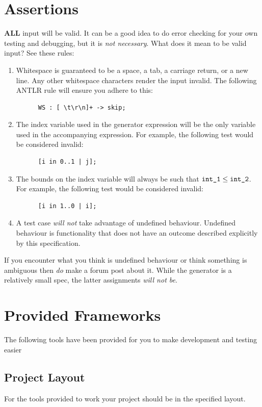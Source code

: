 \documentclass{article}
\newcommand{\code}[1]{\texttt{\textmd{#1}}}
\begin{document}
\section{Assertions}
\textbf{ALL} input will be valid. It can be a good idea to do error checking for your own
testing and debugging, but it is \textit{not necessary}. What does it mean to be valid input?
See these rules:
\begin{enumerate}
  \item
    Whitespace is guaranteed to be a space, a tab, a carriage return, or a new
    line. Any other whitespace characters render the input invalid. The following ANTLR rule
    will ensure you adhere to this:
    \begin{lstlisting}
      WS : [ \t\r\n]+ -> skip;
    \end{lstlisting}
  \item
    The index variable used in the generator expression will be the only variable used in the
    accompanying expression. For example, the following test would be considered invalid:
    \begin{lstlisting}
      [i in 0..1 | j];
    \end{lstlisting}
  \item
    The bounds on the index variable will always be such that $\code{int\_1} \leq
    \code{int\_2}$. For example, the following test would be considered invalid:
    \begin{lstlisting}
      [i in 1..0 | i];
    \end{lstlisting}
  \item
    A test case \textit{will not} take advantage of undefined behaviour. Undefined behaviour is
    functionality that does not have an outcome described explicitly by this specification.
\end{enumerate}
If you encounter what you think is undefined behaviour or think something is ambiguous then
\textit{do} make a forum post about it. While the generator is a relatively small spec,
the latter assignments \textit{will not be}.

\section{Provided Frameworks}

The following tools have been provided for you to make development and testing easier

\subsection{Project Layout}
For the tools provided to work your project should be in the specified layout.
\end{document}
